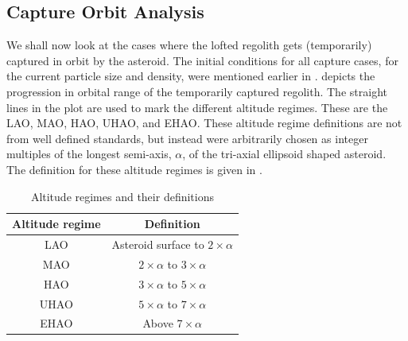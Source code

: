 \subsection{Capture Orbit Analysis}
\label{subsec:capture_orbit_analysis_as_is}
We shall now look at the cases where the lofted regolith gets (temporarily) captured in orbit by the asteroid. The initial conditions for all capture cases, for the current particle size and density, were mentioned earlier in .  depicts the progression in orbital range of the temporarily captured regolith. The straight lines in the plot are used to mark the different altitude regimes. These are the \gls{LAO}, \gls{MAO}, \gls{HAO}, \gls{UHAO}, and \gls{EHAO}. These altitude regime definitions are not from well defined standards, but instead were arbitrarily chosen as integer multiples of the longest semi-axis, $\alpha$, of the tri-axial ellipsoid shaped asteroid. The definition for these altitude regimes is given in .
\begin{table}[htb]
\centering
\captionsetup{justification=centering}
\caption{Altitude regimes and their definitions}
\label{tab:altitude_regimes}
\begin{tabular}{|c|c|}
\hline
\textbf{Altitude regime}        & \textbf{Definition}                    \\ \hline
\gls{LAO}                       & Asteroid surface to $2 \times \alpha$  \\ \hline
\gls{MAO}                       & $2 \times \alpha$ to $3 \times \alpha$ \\ \hline
\gls{HAO}                       & $3 \times \alpha$ to $5 \times \alpha$ \\ \hline
\gls{UHAO}                      & $5 \times \alpha$ to $7 \times \alpha$ \\ \hline
\gls{EHAO}                      & Above $7 \times \alpha$                \\ \hline
\end{tabular}
\end{table}
\FloatBarrier
